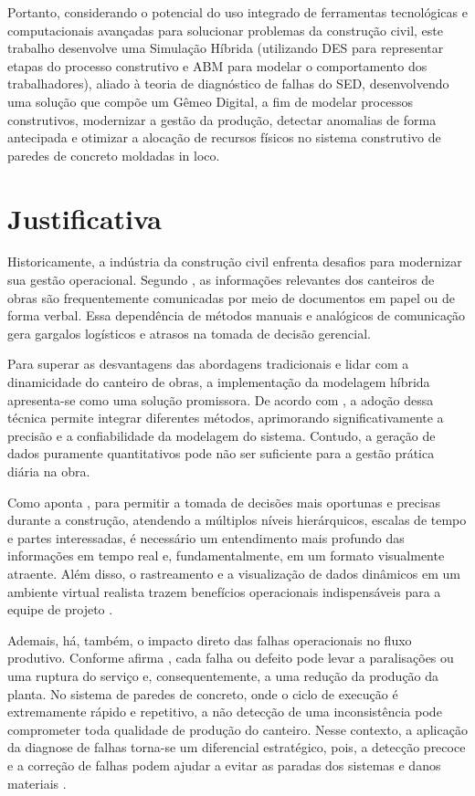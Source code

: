 Portanto, considerando o potencial do uso integrado de ferramentas tecnológicas e computacionais avançadas para solucionar problemas da construção civil, este trabalho desenvolve uma Simulação Híbrida (utilizando DES para representar etapas do processo construtivo e ABM para modelar o comportamento dos trabalhadores), aliado à teoria de diagnóstico de falhas do SED,  desenvolvendo uma solução que compõe um Gêmeo Digital, a fim de modelar processos construtivos, modernizar a gestão da produção, detectar anomalias de forma antecipada e otimizar a alocação de recursos físicos no sistema construtivo de paredes de concreto moldadas in loco.




\section{Justificativa}
\label{sec:justificativa}

Historicamente, a indústria da construção civil enfrenta desafios para modernizar sua gestão operacional. Segundo , as informações relevantes dos canteiros de obras são frequentemente comunicadas por meio de documentos em papel ou de forma verbal. Essa dependência de métodos manuais e analógicos de comunicação gera gargalos logísticos e atrasos na tomada de decisão gerencial.

Para superar as desvantagens das abordagens tradicionais e lidar com a dinamicidade do canteiro de obras, a implementação da modelagem híbrida apresenta-se como uma solução promissora. De acordo com , a adoção dessa técnica permite integrar diferentes métodos, aprimorando significativamente a precisão e a confiabilidade da modelagem do sistema. Contudo, a geração de dados puramente quantitativos pode não ser suficiente para a gestão prática diária na obra.

Como aponta , para permitir a tomada de decisões mais oportunas e precisas durante a construção, atendendo a múltiplos níveis hierárquicos, escalas de tempo e partes interessadas, é necessário um entendimento mais profundo das informações em tempo real e, fundamentalmente, em um formato visualmente atraente. Além disso, o rastreamento e a visualização de dados dinâmicos em um ambiente virtual realista trazem benefícios operacionais indispensáveis para a equipe de projeto \cite{cheng2012}.

Ademais, há, também,  o impacto direto das falhas operacionais no fluxo produtivo. Conforme afirma , cada falha ou defeito pode levar a paralisações ou uma ruptura do serviço e, consequentemente, a uma redução da produção da planta. No sistema de paredes de concreto, onde o ciclo de execução é extremamente rápido e repetitivo, a não detecção de uma inconsistência pode comprometer toda qualidade de produção do canteiro. Nesse contexto, a aplicação da diagnose de falhas torna-se um diferencial estratégico, pois, a detecção precoce e a correção de falhas podem ajudar a evitar as paradas dos sistemas e danos materiais \cite{mestradoDudu}.



